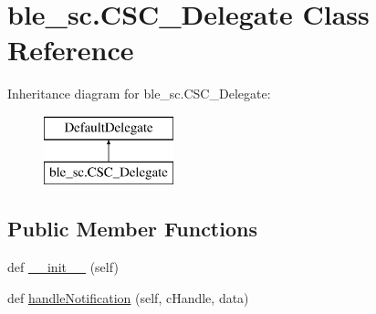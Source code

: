 \hypertarget{classble__sc_1_1CSC__Delegate}{}\section{ble\+\_\+sc.\+C\+S\+C\+\_\+\+Delegate Class Reference}
\label{classble__sc_1_1CSC__Delegate}
Inheritance diagram for ble\+\_\+sc.\+C\+S\+C\+\_\+\+Delegate\+:\begin{figure}[H]
\begin{center}
\leavevmode
\includegraphics[height=2.000000cm]{classble__sc_1_1CSC__Delegate}
\end{center}
\end{figure}
\subsection*{Public Member Functions}
\begin{DoxyCompactItemize}
\item 
def \hyperlink{classble__sc_1_1CSC__Delegate_a343f74589886a83496cca797a4d9d2ab}{\+\_\+\+\_\+init\+\_\+\+\_\+} (self)
\item 
def \hyperlink{classble__sc_1_1CSC__Delegate_a8f8eb71e6870e9bb5f3fbd36d0ccfda9}{handle\+Notification} (self, c\+Handle, data)
\end{DoxyCompactItemize}
